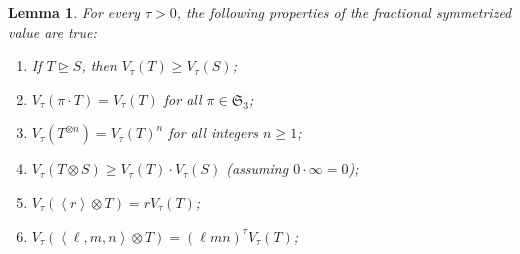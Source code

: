 \documentclass[11pt,letterpaper]{article}
\newtheorem{lemma}[theorem]{Lemma}\AddToHook{env/lemma/begin}{\crefalias{theorem}{lemma}}
\numberwithin{equation}{section}
\begin{document}
\begin{lemma}\label{lem:value-properties}
For every $\tau > 0$, the following properties of the fractional symmetrized value are true:
\begin{enumerate}
    \item If $T \trianglerighteq S$, then $V_\tau(T) \geq V_\tau(S)$;
    \item $V_\tau(\pi \cdot T) = V_\tau(T)$ for all $\pi \in \mathfrak{S}_3$;
    \item $V_\tau(T^{\otimes n}) = V_\tau(T)^n$  for all integers $n \geq 1$;
    \item $V_\tau(T \otimes S) \geq V_\tau(T) \cdot V_\tau(S)$ (assuming $0\cdot\infty = 0$);
    \item $V_\tau(\left<r\right> \otimes T) = r V_\tau(T)$;
    \item $V_\tau(\left<\ell, m, n\right> \otimes T) = (\ell mn)^\tau V_\tau(T)$;
\end{enumerate}
\end{lemma}
\end{document}
